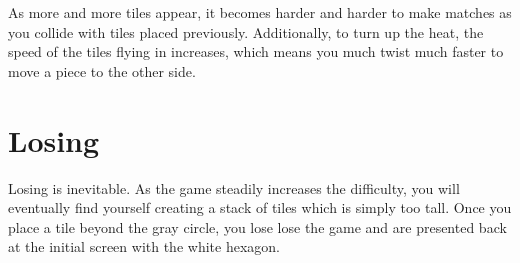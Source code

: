 \documentclass{article}
\begin{document}
As more and more tiles appear, it becomes harder and harder to make matches as you collide with tiles placed previously. Additionally, to turn up the heat, the speed of the tiles flying in increases, which means you much twist much faster to move a piece to the other side.

\section{Losing}
Losing is inevitable. As the game steadily increases the difficulty, you will eventually find yourself creating a stack of tiles which is simply too tall. Once you place a tile beyond the gray circle, you lose lose the game and are presented back at the initial screen with the white hexagon. 
\end{document}
